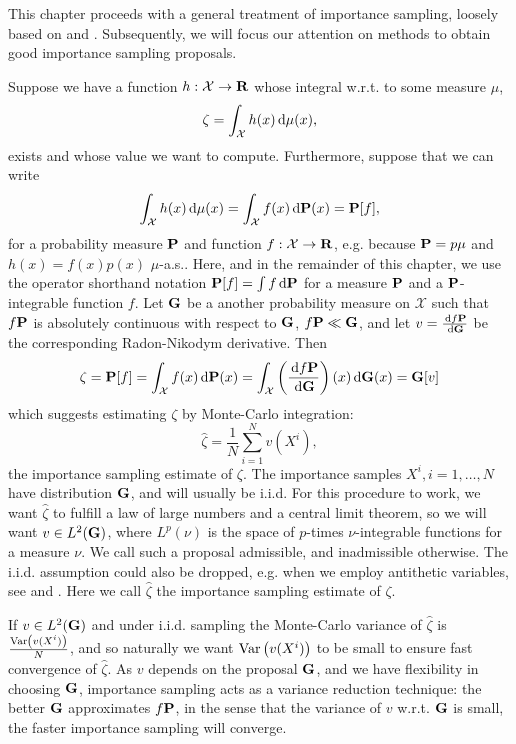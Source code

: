 This chapter proceeds with a general treatment of importance sampling, loosely based on \citep[Chapter 8]{Chopin2020Introduction} and \citep[Chapter 11]{Durbin2012Time}. Subsequently, we will focus our attention on methods to obtain good importance sampling proposals. 

Suppose we have a function $h: \mathcal X \to \R$ whose integral w.r.t. to some measure $\mu$, $$\zeta = \int_{\mathcal X} h(x) \d\mu(x),$$ exists and whose value we want to compute. 
Furthermore, suppose that we can write
$$
    \int_{\mathcal X} h(x) \d \mu(x) = \int_{\mathcal X} f(x) \d \P(x) = \P [f],
$$
for a probability measure $\P$ and function $f: \mathcal X \to \R$, e.g. because $\P = p \mu$ and $h(x) = f(x) p(x)$ $\mu$-a.s.. Here, and in the remainder of this chapter, we use the operator shorthand notation $\P [f] = \int f \d\P$ for a measure $\P$ and a $\P$-integrable function $f$.
Let $\G$ be a another probability measure on $\mathcal X$ such that $f\P$ is absolutely continuous with respect to $\G$, $f\P \ll \G$, and let $v = \frac{\d f\P}{\d\G}$ be the corresponding Radon-Nikodym derivative. Then
$$
    \zeta = \P [f] = \int_{\mathcal X} f(x) \d \P(x) = \int_{\mathcal X} \left(\rnd{f\P}{\G}\right)(x)\d\G(x) = \G [v]
$$
which suggests estimating $\zeta$ by Monte-Carlo integration: $$\hat \zeta = \frac 1 N \sum_{i=1}^{N} v(X^{i}), $$ the importance sampling estimate of $\zeta$. The importance samples $X^{i}, i = 1, \dots, N$ have distribution $\G$, and will usually be i.i.d. For this procedure to work, we want $\hat \zeta$ to fulfill a law of large numbers and a central limit theorem, so we will want $v \in L^{2}(\G)$, where $L^{p}(\nu)$ is the space of $p$-times $\nu$-integrable functions for a measure $\nu$. 
We call such a proposal admissible, and inadmissible otherwise.
The i.i.d. assumption could also be dropped, e.g. when we employ antithetic variables, see \citep[Section 5.3]{Ripley2009Stochastic} and . Here we call $\hat \zeta$ the importance sampling estimate of $\zeta$. 

If $v \in L^{2}(\G)$ and under i.i.d. sampling the Monte-Carlo variance of $\hat \zeta$ is $\frac{\var \left(v(X^{i})\right)}{N}$, and so naturally we want $\var \left(v(X^{i})\right)$ to be small to ensure fast convergence of $\hat \zeta$. As $v$ depends on the proposal $\G$, and we have flexibility in choosing $\G$, importance sampling acts as a variance reduction technique: the better $\G$ approximates $f\P$, in the sense that the variance of $v$ w.r.t. $\G$ is small, the faster importance sampling will converge. 


